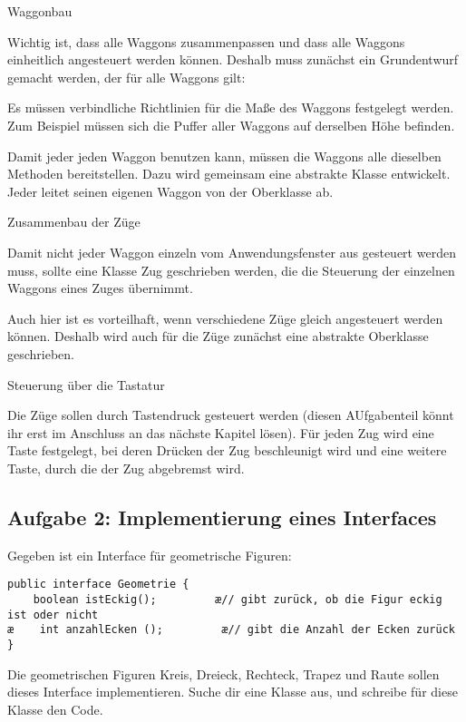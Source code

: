 \begin{compactenum}[1.]
\item Waggonbau

Wichtig ist, dass alle Waggons zusammenpassen und dass alle Waggons einheitlich
angesteuert werden können. Deshalb muss zunächst ein Grundentwurf gemacht
werden, der für alle Waggons gilt:
\begin{compactenum}[a)]
\item Es müssen verbindliche Richtlinien für die Maße des Waggons festgelegt
werden. Zum Beispiel müssen sich die Puffer aller Waggons auf derselben Höhe
befinden.
\item Damit jeder jeden Waggon benutzen kann, müssen die Waggons alle dieselben
Methoden bereitstellen. Dazu wird gemeinsam eine abstrakte Klasse 
entwickelt. Jeder leitet seinen eigenen Waggon von der Oberklasse
 ab.
\end{compactenum}

\item Zusammenbau der Züge

Damit nicht jeder Waggon einzeln vom Anwendungsfenster aus gesteuert werden
muss, sollte eine Klasse Zug geschrieben werden, die die Steuerung der
einzelnen Waggons eines Zuges übernimmt.

Auch hier ist es vorteilhaft, wenn verschiedene Züge gleich angesteuert werden
können. Deshalb wird auch für die Züge zunächst eine abstrakte Oberklasse
geschrieben.

\item Steuerung über die Tastatur

Die Züge sollen durch Tastendruck gesteuert werden (diesen AUfgabenteil könnt
ihr erst im Anschluss an das nächste Kapitel lösen). Für jeden Zug wird eine
Taste festgelegt, bei deren Drücken der Zug beschleunigt wird und eine weitere
Taste, durch die der Zug abgebremst wird.
\end{compactenum}


\subsection{Aufgabe 2: Implementierung eines Interfaces}

Gegeben ist ein Interface für geometrische Figuren:

\begin{lstlisting}
public interface Geometrie {
    boolean istEckig();         æ// gibt zurück, ob die Figur eckig ist oder nicht 
æ    int anzahlEcken ();         æ// gibt die Anzahl der Ecken zurück
}
\end{lstlisting}

Die geometrischen Figuren Kreis, Dreieck, Rechteck, Trapez und Raute sollen
dieses Interface implementieren. Suche dir eine Klasse aus, und schreibe für
diese Klasse den Code.
